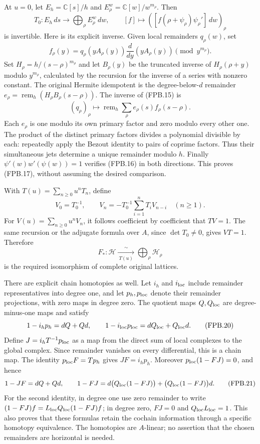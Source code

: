 At \(u=0\), let \(E_h=\mathbb{C}[s]/h\) and
\(E_\rho^w=\mathbb{C}[w]/w^{m_\rho}\). Then
\[
 T_0:E_h\,ds\longrightarrow\bigoplus_\rho E_\rho^w\,dw,
 \qquad [f]\longmapsto
   ([f(\rho+\psi_\rho)\psi_\rho']\,dw)_\rho
 \tag{FPB.15}\label{eq:fpb-T0}
\]
is invertible. Here is its explicit inverse. Given local remainders
\(q_\rho(w)\), set
\[
 f_\rho(y)=q_\rho(yA_\rho(y))
       \frac{d}{dy}(yA_\rho(y))\pmod {y^{m_\rho}}.
 \tag{FPB.16}\label{eq:fpb-inverse-jet}
\]
Set \(H_\rho=h/(s-\rho)^{m_\rho}\) and let \(B_\rho(y)\) be the
truncated inverse of \(H_\rho(\rho+y)\) modulo \(y^{m_\rho}\),
calculated by the recursion for the inverse of a series with nonzero
constant. The original Hermite idempotent is the degree-below-\(d\)
remainder
\(e_\rho=\operatorname{rem}_h(H_\rho B_\rho(s-\rho))\).
The inverse of (FPB.15) is
\[
 (q_\rho)_\rho\longmapsto
  \operatorname{rem}_h\sum_\rho e_\rho(s)f_\rho(s-\rho).
 \tag{FPB.17}\label{eq:fpb-CRT}
\]
Each \(e_\rho\) is one modulo its own primary factor and zero
modulo every other one. The product of the distinct primary factors
divides a polynomial divisible by each: repeatedly apply the Bezout
identity to pairs of coprime factors. Thus their simultaneous jets
determine a unique remainder modulo \(h\). Finally
\(\psi'(w)w'(\psi(w))=1\) verifies (FPB.16) in both directions.
This proves (FPB.17), without assuming the desired comparison.

With \(T(u)=\sum_{n\ge0}u^nT_n\), define
\[
 V_0=T_0^{-1},\qquad
 V_n=-T_0^{-1}\sum_{i=1}^n T_iV_{n-i}\quad(n\ge1).
 \tag{FPB.18}\label{eq:fpb-Tinverse}
\]
For \(V(u)=\sum_{n\ge0}u^nV_n\), it follows coefficient by
coefficient that \(TV=1\). The same
recursion or the adjugate formula over \(A\), since \(\det T_0\ne0\),
gives \(VT=1\). Therefore
\[
 F_*: \mathcal H\xrightarrow[\ T(u)\ ]{\ \sim\ }
       \bigoplus_\rho\mathcal H_\rho
 \tag{FPB.19}\label{eq:fpb-isomorphism}
\]
is the required isomorphism of complete original lattices.

There are explicit chain homotopies as well. Let \(i_h\) and
\(i_{\rm loc}\) include remainder representatives into degree one,
and let \(p_h,p_{\rm loc}\) denote their remainder projections,
with zero maps in degree zero. The quotient maps \(Q,Q_{\rm loc}\)
are degree-minus-one maps and satisfy
\[
 1-i_hp_h=dQ+Qd,\qquad
 1-i_{\rm loc}p_{\rm loc}=dQ_{\rm loc}+Q_{\rm loc}d.
 \tag{FPB.20}\label{eq:fpb-contractions}
\]
Define \(J=i_hT^{-1}p_{\rm loc}\) as a map from the direct sum of
local complexes to the global complex. Since remainder vanishes on
every differential, this is a chain map. The identity
\(p_{\rm loc}F=Tp_h\) gives \(JF=i_hp_h\). Moreover
\(p_{\rm loc}(1-FJ)=0\), and hence
\[
 1-JF=dQ+Qd,
 \qquad
 1-FJ=d\bigl(Q_{\rm loc}(1-FJ)\bigr)
          +\bigl(Q_{\rm loc}(1-FJ)\bigr)d.
 \tag{FPB.21}\label{eq:fpb-homotopy}
\]
For the second identity, in degree one use zero remainder to write
\((1-FJ)f=L_{\rm loc}Q_{\rm loc}(1-FJ)f\); in degree zero,
\(FJ=0\) and \(Q_{\rm loc}L_{\rm loc}=1\). This also proves that
these formulas retain the cochain information through a specific
homotopy equivalence. The homotopies are \(A\)-linear; no assertion
that the chosen remainders are horizontal is needed.

